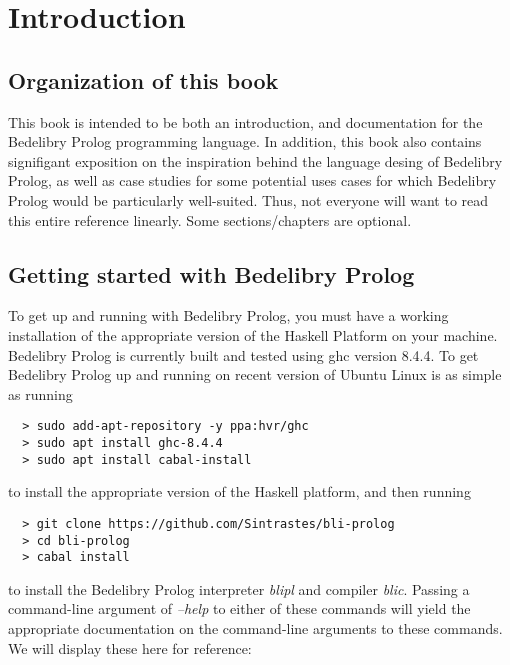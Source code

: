 \documentclass{book}
\begin{document}
\tableofcontents

\chapter{Introduction}

\section{Organization of this book}

This book is intended to be both an introduction, and documentation for the Bedelibry Prolog programming language. In addition, this book also contains signifigant exposition on the inspiration behind the language desing of Bedelibry Prolog, as well as case studies for some potential uses cases for which Bedelibry Prolog would be particularly well-suited. Thus, not everyone will want to read this entire reference linearly. Some sections/chapters are optional.



\section{Getting started with Bedelibry Prolog}

To get up and running with Bedelibry Prolog, you must have a working installation of the appropriate version of the Haskell Platform on your machine. Bedelibry Prolog is currently built and tested using ghc version 8.4.4. To get Bedelibry Prolog up and running on recent version of Ubuntu Linux is as simple as running

\begin{verbatim}
  > sudo add-apt-repository -y ppa:hvr/ghc
  > sudo apt install ghc-8.4.4
  > sudo apt install cabal-install
\end{verbatim}

\noindent to install the appropriate version of the Haskell platform, and then running

\begin{verbatim}
  > git clone https://github.com/Sintrastes/bli-prolog
  > cd bli-prolog
  > cabal install
\end{verbatim}

\noindent to install the Bedelibry Prolog interpreter \textit{blipl} and compiler \textit{blic}. Passing a command-line argument of \textit{--help} to either of these commands will yield the appropriate documentation on the command-line arguments to these commands. We will display these here for reference:
\end{document}
